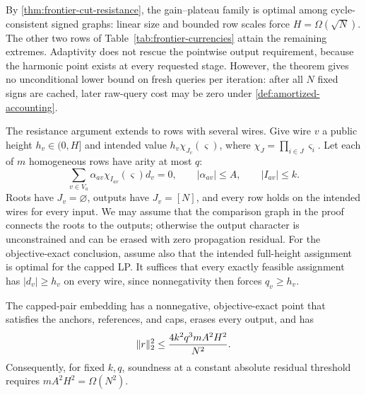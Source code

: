 By \cref{thm:frontier-cut-resistance}, the gain--plateau family is
optimal among cycle-consistent signed graphs: linear size and bounded row
scales force \(H=\Omega(\sqrt N)\).  The other two rows of
Table~\ref{tab:frontier-currencies} attain the remaining extremes.
Adaptivity does not rescue the pointwise output requirement, because the
harmonic point exists at every requested stage.  However, the theorem gives
no unconditional lower bound on fresh queries per iteration:
after all \(N\) fixed signs are cached, later raw-query cost may be zero
under \cref{def:amortized-accounting}.

The resistance argument extends to rows with several wires.
Give wire \(v\) a public height \(h_v\in(0,H]\) and intended value
\(h_v\chi_{J_v}(\varsigma)\), where
\(\chi_J=\prod_{i\in J}\varsigma_i\).  Let each of \(m\) homogeneous rows
have arity at most \(q\):
\begin{equation}
 \sum_{v\in V_a}\alpha_{av}\chi_{I_{av}}(\varsigma)d_v=0,
 \qquad |\alpha_{av}|\leq A,\qquad |I_{av}|\leq k.
 \label{eq:frontier-walsh-row}
\end{equation}
Roots have \(J_v=\varnothing\), outputs have \(J_v=[N]\), and every row
holds on the intended wires for every input.  We may assume that the
comparison graph in the proof connects the roots to the outputs; otherwise the output character is unconstrained and can be erased with zero
propagation residual.
For the objective-exact conclusion, assume also that the intended
full-height assignment is optimal for the capped LP.  It suffices that
every exactly feasible assignment has \(|d_v|\geq h_v\) on every wire,
since nonnegativity then forces \(q_v\geq h_v\).

\begin{theorem}
\label{thm:frontier-walsh}
The capped-pair embedding has a nonnegative, objective-exact point that
satisfies the anchors, references, and caps, erases every output, and has
\begin{equation}
 \lVert r\rVert_2^2\leq
 \frac{4k^2q^3mA^2H^2}{N^2}.
 \label{eq:frontier-walsh-residual}
\end{equation}
Consequently, for fixed \(k,q\), soundness at a constant absolute residual
threshold requires \(mA^2H^2=\Omega(N^2)\).
\end{theorem}

